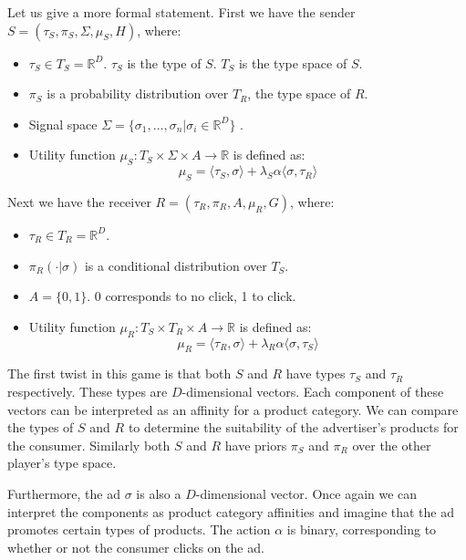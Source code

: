 \documentclass{article}
\begin{document}
Let us give a more formal statement. First we have the sender $S = (\tau_S, \pi_S, \Sigma, \mu_S, H)$, where:
\begin{itemize}
    \item $\tau_S \in T_S = \mathbb{R}^D$. $\tau_S$ is the type of $S$. $T_S$ is the type space of $S$.
    \item $\pi_S$ is a probability distribution over $T_R$, the type space of $R$.
    \item Signal space $\Sigma = \lbrace \sigma_1, ..., \sigma_n \vert \sigma_i \in \mathbb{R}^D \rbrace$ .
    \item Utility function $\mu_S: T_S \times \Sigma \times A \rightarrow \mathbb{R}$ is defined as:
    \begin{equation}
        \mu_S = \langle \tau_S, \sigma \rangle + \lambda_S \alpha \langle \sigma, \tau_R \rangle
    \end{equation}
\end{itemize}

\noindent Next we have the receiver $R = (\tau_R, \pi_R, A, \mu_R, G)$, where:
\begin{itemize}
    \item $\tau_R \in T_R = \mathbb{R}^D$.
    \item $\pi_R(\cdot|\sigma)$ is a conditional distribution over $T_S$.
    \item $A = \lbrace 0,1 \rbrace$. 0 corresponds to no click, 1 to click.
    \item Utility function $\mu_R: T_S \times T_R \times A \rightarrow \mathbb{R}$ is defined as:
    \begin{equation}
        \mu_R = \langle \tau_R, \sigma \rangle + \lambda_R \alpha \langle \sigma, \tau_S \rangle
    \end{equation}
\end{itemize}

\noindent The first twist in this game is that both $S$ and $R$ have types $\tau_S$ and $\tau_R$ respectively. These types are $D$-dimensional vectors. Each component of these vectors can be interpreted as an affinity for a product category. We can compare the types of $S$ and $R$ to determine the suitability of the advertiser's products for the consumer. Similarly both $S$ and $R$ have priors $\pi_S$ and $\pi_R$ over the other player's type space.

Furthermore, the ad $\sigma$ is also a $D$-dimensional vector. Once again we can interpret the components as product category affinities and imagine that the ad promotes certain types of products. The action $\alpha$ is binary, corresponding to whether or not the consumer clicks on the ad.
\end{document}
